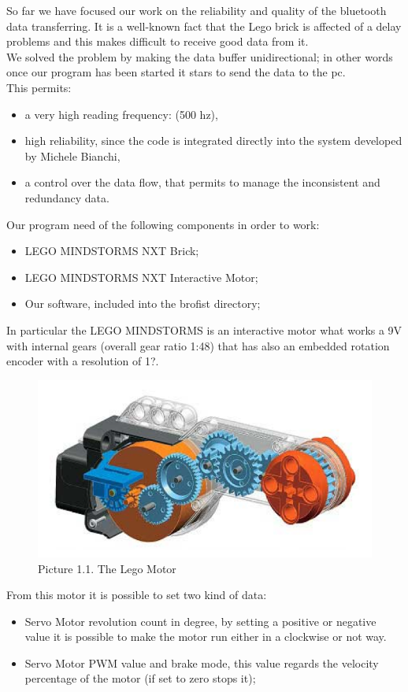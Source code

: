 So far we have focused our work on the reliability and quality of the bluetooth data transferring. It is a well-known fact that the Lego brick is affected of a delay problems and this makes difficult to receive good data from it. \\ We solved the problem by making the data buffer unidirectional; in other words once our program has been started it stars to send the data to the pc. \\This permits:  

\begin{itemize}
\item a very high reading frequency: (500 hz),
\item high reliability, since the code is integrated directly into the system developed by Michele Bianchi, 
\item a control over the data flow, that permits to manage the inconsistent and redundancy data. 
\end{itemize}

Our program need of the following components in order to work: 
\begin{itemize}
\item LEGO MINDSTORMS NXT Brick;
\item LEGO MINDSTORMS NXT Interactive Motor;
\item Our software, included into the brofist directory;
\end{itemize}
In particular the LEGO MINDSTORMS is an interactive motor what works a 9V with internal gears (overall gear ratio 1:48) that has also an embedded rotation encoder with a resolution of 1?.
\begin{figure} [htb!]
  \centering
 \includegraphics[scale = 0.40]{Graphics/legomotor.png}
 \caption{Picture 1.1. The Lego Motor}
  \label{fig:pos} 
\end{figure}
From this motor it is possible to set two kind of data: 
\begin{itemize}
\item Servo Motor revolution count in degree, by setting a positive or negative value it is possible to make the motor run either in a clockwise or not way.
\item Servo Motor PWM value and brake mode, this value regards the velocity percentage of the motor (if set to zero stops it); 
\end{itemize}

